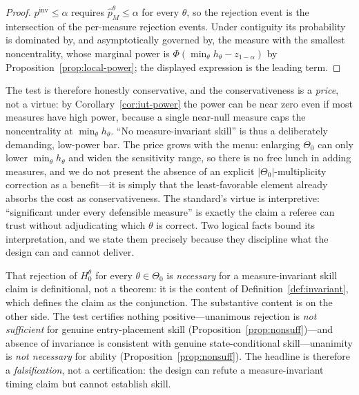 \begin{proof}
$p^{\mathrm{inv}}\le\alpha$ requires $\hat p_M^\theta\le\alpha$ for every
$\theta$, so the rejection event is the intersection of the per-measure rejection
events. Under contiguity its probability is dominated by, and asymptotically
governed by, the measure with the smallest noncentrality, whose marginal power is
$\Phi(\min_\theta h_\theta-z_{1-\alpha})$ by Proposition~\ref{prop:local-power};
the displayed expression is the leading term.
\end{proof}

The test is therefore honestly conservative, and the conservativeness is a
\emph{price}, not a virtue: by Corollary~\ref{cor:iut-power} the power can be near
zero even if most measures have high power, because a single near-null measure
caps the noncentrality at $\min_\theta h_\theta$. ``No measure-invariant skill''
is thus a deliberately demanding, low-power bar. The price grows with the menu:
enlarging $\Theta_0$ can only lower $\min_\theta h_\theta$ and widen the
sensitivity range, so there is no free lunch in adding measures, and we do not
present the absence of an explicit $|\Theta_0|$-multiplicity correction as a
benefit---it is simply that the least-favorable element already absorbs the cost
as conservativeness. The standard's virtue is interpretive: ``significant under
every defensible measure'' is exactly the claim a referee can trust without
adjudicating which $\theta$ is correct. Two logical facts bound its
interpretation, and we state them precisely because they discipline what the
design can and cannot deliver.

\begin{remark}
\label{rem:necessity}
That rejection of $H_0^\theta$ for every $\theta\in\Theta_0$ is \emph{necessary}
for a measure-invariant skill claim is definitional, not a theorem: it is the
content of Definition~\ref{def:invariant}, which defines the claim as the
conjunction. The substantive content is on the other side. The test certifies
nothing positive---unanimous rejection is \emph{not sufficient} for genuine
entry-placement skill (Proposition~\ref{prop:nonsuff})---and absence of invariance
is consistent with genuine state-conditional skill---unanimity is \emph{not
necessary} for ability (Proposition~\ref{prop:nonsuff}). The headline is therefore
a \emph{falsification}, not a certification: the design can refute a
measure-invariant timing claim but cannot establish skill.
\end{remark}

